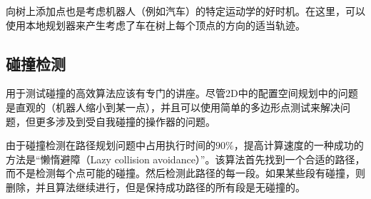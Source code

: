 向树上添加点也是考虑机器人（例如汽车）的特定运动学的好时机。在这里，可以使用本地规划器来产生考虑了车在树上每个顶点的方向的适当轨迹。


\subsection{碰撞检测}
用于测试碰撞的高效算法应该有专门的讲座。尽管2D中的配置空间规划中的问题是直观的（机器人缩小到某一点），并且可以使用简单的多边形点测试来解决问题，但更多涉及到受自我碰撞的操作器的问题。


由于碰撞检测在路径规划问题中占用执行时间的$90\%$，提高计算速度的一种成功的方法是“懒惰避障（Lazy collision avoidance）”。该算法首先找到一个合适的路径，而不是检测每个点可能的碰撞。然后检测此路径的每一段。如果某些段有碰撞，则删除，并且算法继续进行，但是保持成功路径的所有段是无碰撞的。



